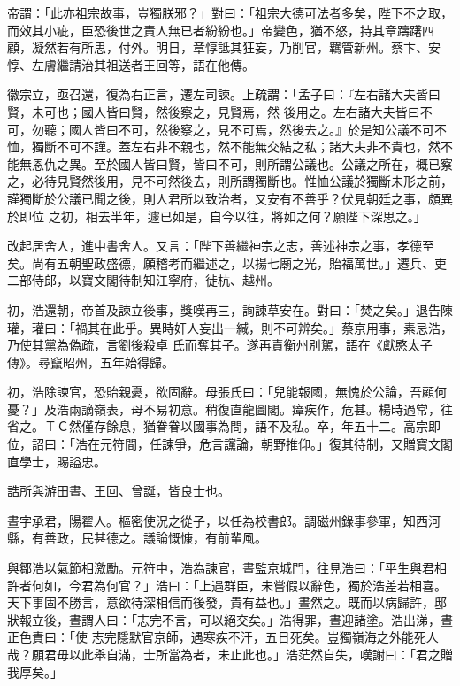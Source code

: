 \begin{pinyinscope}
 帝謂：「此亦祖宗故事，豈獨朕邪？」對曰：「祖宗大德可法者多矣，陛下不之取，而效其小疵，臣恐後世之責人無已者紛紛也。」帝變色，猶不怒，持其章躊躇四顧，凝然若有所思，付外。明日，章惇詆其狂妄，乃削官，羈管新州。蔡卞、安惇、左膚繼請治其祖送者王回等，語在他傳。



 徽宗立，亟召還，復為右正言，遷左司諫。上疏謂：「孟子曰：『左右諸大夫皆曰賢，未可也；國人皆曰賢，然後察之，見賢焉，然
 後用之。左右諸大夫皆曰不可，勿聽；國人皆曰不可，然後察之，見不可焉，然後去之。』於是知公議不可不恤，獨斷不可不謹。蓋左右非不親也，然不能無交結之私；諸大夫非不貴也，然不能無恩仇之異。至於國人皆曰賢，皆曰不可，則所謂公議也。公議之所在，概已察之，必待見賢然後用，見不可然後去，則所謂獨斷也。惟恤公議於獨斷未形之前，謹獨斷於公議已聞之後，則人君所以致治者，又安有不善乎？伏見朝廷之事，頗異於即位
 之初，相去半年，遽已如是，自今以往，將如之何？願陛下深思之。」



 改起居舍人，進中書舍人。又言：「陛下善繼神宗之志，善述神宗之事，孝德至矣。尚有五朝聖政盛德，願稽考而繼述之，以揚七廟之光，貽福萬世。」遷兵、吏二部侍郎，以寶文閣待制知江寧府，徙杭、越州。



 初，浩還朝，帝首及諫立後事，獎嘆再三，詢諫草安在。對曰：「焚之矣。」退告陳瓘，瓘曰：「禍其在此乎。異時奸人妄出一緘，則不可辨矣。」蔡京用事，素忌浩，乃使其黨為偽疏，言劉後殺卓
 氏而奪其子。遂再責衡州別駕，語在《獻愍太子傳》。尋竄昭州，五年始得歸。



 初，浩除諫官，恐貽親憂，欲固辭。母張氏曰：「兒能報國，無愧於公論，吾顧何憂？」及浩兩謫嶺表，母不易初意。稍復直龍圖閣。瘴疾作，危甚。楊時過常，往省之。ＴＣ然僅存餘息，猶眷眷以國事為問，語不及私。卒，年五十二。高宗即位，詔曰：「浩在元符間，任諫爭，危言讜論，朝野推仰。」復其待制，又贈寶文閣直學士，賜謚忠。



 誥所與游田晝、王回、曾誕，皆良士也。



 晝字承君，陽翟人。樞密使況之從子，以任為校書郎。調磁州錄事參軍，知西河縣，有善政，民甚德之。議論慨慷，有前輩風。



 與鄒浩以氣節相激勵。元符中，浩為諫官，晝監京城門，往見浩曰：「平生與君相許者何如，今君為何官？」浩曰：「上遇群臣，未嘗假以辭色，獨於浩差若相喜。天下事固不勝言，意欲待深相信而後發，貴有益也。」晝然之。既而以病歸許，邸狀報立後，晝謂人曰：「志完不言，可以絕交矣。」浩得罪，晝迎諸塗。浩出涕，晝正色責曰：「使
 志完隱默官京師，遇寒疾不汗，五日死矣。豈獨嶺海之外能死人哉？願君毋以此舉自滿，士所當為者，未止此也。」浩茫然自失，嘆謝曰：「君之贈我厚矣。」




\end{pinyinscope}
